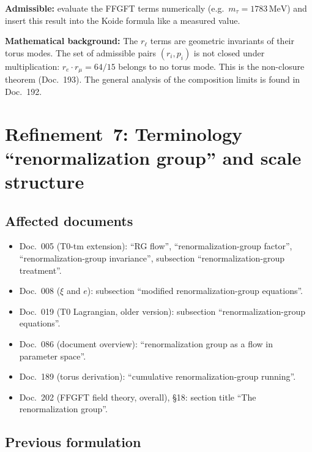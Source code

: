 \textbf{Admissible:} evaluate the FFGFT terms numerically (e.g.\
$m_\tau = 1783\,\text{MeV}$) and insert this result into the Koide formula like
a measured value.

\textbf{Mathematical background:} The $r_\ell$ terms are geometric invariants
of their torus modes. The set of admissible pairs $(r_i, p_i)$ is not closed
under multiplication: $r_e \cdot r_\mu = 64/15$ belongs to no torus mode. This
is the non-closure theorem (Doc.~193). The general analysis of the composition
limits is found in Doc.~192.

\section{\texorpdfstring{Refinement~7: Terminology \enquote{renormalization group} and scale structure}{Refinement 7: Terminology renormalization group and scale structure}}

\subsection*{Affected documents}

\begin{itemize}
  \item Doc.~005 (T0-tm extension): \enquote{RG flow}, \enquote{renormalization-group factor},
        \enquote{renormalization-group invariance},
        subsection \enquote{renormalization-group treatment}.
  \item Doc.~008 ($\xi$ and $e$): subsection \enquote{modified
        renormalization-group equations}.
  \item Doc.~019 (T0 Lagrangian, older version):
        subsection \enquote{renormalization-group equations}.
  \item Doc.~086 (document overview): \enquote{renormalization group as a flow
        in parameter space}.
  \item Doc.~189 (torus derivation): \enquote{cumulative
        renormalization-group running}.
  \item Doc.~202 (FFGFT field theory, overall), \S 18:
        section title \enquote{The renormalization group}.
\end{itemize}

\subsection*{Previous formulation}


